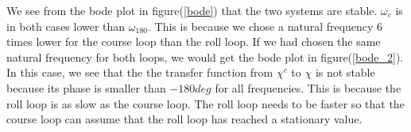 We see from the bode plot in figure(\ref{bode}) that the two systems are stable. $\omega_c$ is in both cases lower than $\omega_{180}$. This is because we chose a natural frequency 6 times lower for the course loop than the roll loop. If we had chosen the same natural frequency for both loops, we would get the bode plot in figure(\ref{bode_2}). In this case, we see that the the transfer function from $\chi^c$ to $\chi$ is not stable because its phase is smaller than $-180 deg$ for all frequencies. This is because the roll loop is as slow as the course loop. The roll loop needs to be faster so that the course loop can assume that the roll loop has reached a stationary value.